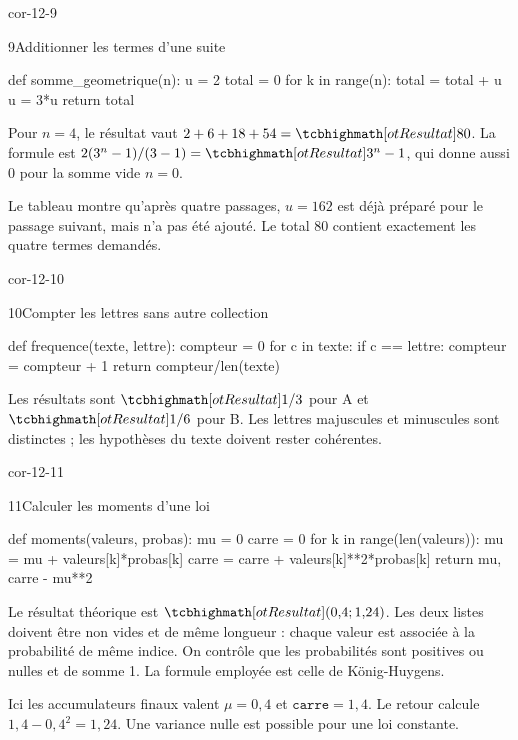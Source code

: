 \begin{blocLivre}{cor-12-9}
\begin{corrige}{9}{Additionner les termes d'une suite}
\begin{python}
def somme_geometrique(n):
    u = 2
    total = 0
    for k in range(n):
        total = total + u
        u = 3*u
    return total
\end{python}
Pour $n=4$, le résultat vaut $2+6+18+54=\res{80}$.
La formule est $2(3^n-1)/(3-1)=\res{3^n-1}$, qui donne aussi 0 pour la somme vide $n=0$.

Le tableau montre qu’après quatre passages, $u=162$ est déjà préparé pour le passage suivant, mais n’a pas été ajouté. Le total 80 contient exactement les quatre termes demandés.

\label{figlivre-r12-09-trace-cor}

\end{corrige}
\end{blocLivre}
\begin{blocLivre}{cor-12-10}
\begin{corrige}{10}{Compter les lettres sans autre collection}
\begin{python}
def frequence(texte, lettre):
    compteur = 0
    for c in texte:
        if c == lettre:
            compteur = compteur + 1
    return compteur/len(texte)
\end{python}
Les résultats sont $\res{1/3}$ pour A et $\res{1/6}$ pour B.
Les lettres majuscules et minuscules sont distinctes ; les hypothèses du texte doivent rester cohérentes.
\end{corrige}
\end{blocLivre}
\begin{blocLivre}{cor-12-11}
\begin{corrige}{11}{Calculer les moments d'une loi}
\begin{python}
def moments(valeurs, probas):
    mu = 0
    carre = 0
    for k in range(len(valeurs)):
        mu = mu + valeurs[k]*probas[k]
        carre = carre + valeurs[k]**2*probas[k]
    return mu, carre - mu**2
\end{python}
Le résultat théorique est $\res{(0{,}4;1{,}24)}$.
Les deux listes doivent être non vides et de même longueur : chaque valeur est associée à la probabilité de même indice. On contrôle que les probabilités sont positives ou nulles et de somme 1.
La formule employée est celle de König-Huygens.

Ici les accumulateurs finaux valent $\mu=0{,}4$ et $\texttt{carre}=1{,}4$. Le retour calcule $1{,}4-0{,}4^2=1{,}24$. Une variance nulle est possible pour une loi constante.

\label{figlivre-r12-11-moments-cor}

\end{corrige}
\end{blocLivre}
